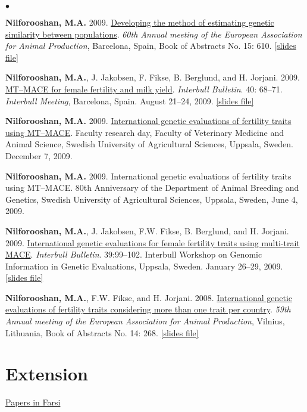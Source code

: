 \documentclass[margin,line]{res}
\newenvironment{list2}{
  \begin{list}{$\bullet$}{%
      \setlength{\itemsep}{0in}
      \setlength{\parsep}{0in} \setlength{\parskip}{0in}
      \setlength{\topsep}{0in} \setlength{\partopsep}{0in}
      \setlength{\leftmargin}{0.2in}}}{\end{list}}
\begin{document}
\begin{resume}
\begin{list2}
\item {\bf Nilforooshan, M.A.} 2009. \href{https://drive.google.com/file/d/0B2l_izQwJmVpYW04amtSMGdjUmM/view?usp=sharing}{Developing the method of estimating genetic similarity between populations}. {\em 60th Annual meeting of the European Association for Animal Production}, Barcelona, Spain, Book of Abstracts No. 15: 610. \href{http://old.eaap.org/Previous_Annual_Meetings/2009Barcelona/Papers/53_Nilforooshan.pdf}{[slides file]}
\item {\bf Nilforooshan, M.A.}, J. Jakobsen, F. Fikse, B. Berglund, and H. Jorjani. 2009. \href{https://journal.interbull.org/index.php/ib/article/view/1087}{MT–MACE for female fertility and milk yield}. {\em Interbull Bulletin}. 40: 68--71. {\em Interbull Meeting}, Barcelona, Spain. August 21--24, 2009. \href{https://drive.google.com/file/d/0B2l_izQwJmVpRTlrOGE3OWluVnc/view?usp=sharing}{[slides file]}
\item {\bf Nilforooshan, M.A.} 2009. \href{https://drive.google.com/file/d/0B2l_izQwJmVpUC1TVkx2MVc1ZUE/view?usp=sharing}{International genetic evaluations of fertility traits using MT–MACE}. Faculty research day, Faculty of Veterinary Medicine and Animal Science, Swedish University of Agricultural Sciences, Uppsala, Sweden. December 7, 2009.
\item {\bf Nilforooshan, M.A.} 2009. International genetic evaluations of fertility traits using MT–MACE. 80th Anniversary of the Department of Animal Breeding and Genetics, Swedish University of Agricultural Sciences, Uppsala, Sweden, June 4, 2009.
\item {\bf Nilforooshan, M.A.}, J. Jakobsen, F.W. Fikse, B. Berglund, and H. Jorjani. 2009. \href{https://journal.interbull.org/index.php/ib/article/view/1073}{International genetic evaluations for female fertility traits using multi-trait MACE}. {\em Interbull Bulletin}. 39:99--102. Interbull Workshop on Genomic Information in Genetic Evaluations, Uppsala, Sweden. January 26--29, 2009. \href{https://drive.google.com/file/d/0B2l_izQwJmVpZG1sZlg2cF9zRWc/view?usp=sharing}{[slides file]}
\item {\bf Nilforooshan, M.A.}, F.W. Fikse, and H. Jorjani. 2008. \href{https://drive.google.com/file/d/0B2l_izQwJmVpQWdZaTFwTUNXOFk/view?usp=sharing}{International genetic evaluations of fertility traits considering more than one trait per country}. {\em 59th Annual meeting of the European Association for Animal Production}, Vilnius, Lithuania, Book of Abstracts No. 14: 268. \href{http://old.eaap.org/Previous_Annual_Meetings/2008Vilnius/Papers/published/35_Nilforooshan.pdf}{[slides file]}
\end{list2}
\section{\sc Extension}

\href{https://nilforooshan.github.io/resume/extension}{Papers in Farsi}

\end{resume}
\end{document}
